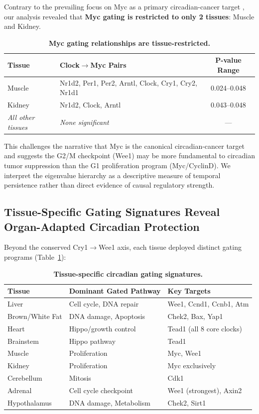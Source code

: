 \documentclass[11pt,letterpaper]{article}
\begin{document}
Contrary to the prevailing focus on Myc as a primary circadian-cancer target \citep{altman2015}, our analysis revealed that \textbf{Myc gating is restricted to only 2 tissues}: Muscle and Kidney.

\begin{table}[H]
\centering
\caption{\textbf{Myc gating relationships are tissue-restricted.}}
\begin{tabular}{llc}
\toprule
\textbf{Tissue} & \textbf{Clock$\rightarrow$Myc Pairs} & \textbf{P-value Range} \\
\midrule
Muscle & Nr1d2, Per1, Per2, Arntl, Clock, Cry1, Cry2, Nr1d1 & 0.024--0.048 \\
Kidney & Nr1d2, Clock, Arntl & 0.043--0.048 \\
\textit{All other tissues} & \textit{None significant} & --- \\
\bottomrule
\end{tabular}
\end{table}

This challenges the narrative that Myc is the canonical circadian-cancer target and suggests the G2/M checkpoint (Wee1) may be more fundamental to circadian tumor suppression than the G1 proliferation program (Myc/CyclinD). We interpret the eigenvalue hierarchy as a descriptive measure of temporal persistence rather than direct evidence of causal regulatory strength.

\subsection{Tissue-Specific Gating Signatures Reveal Organ-Adapted Circadian Protection}

Beyond the conserved Cry1$\rightarrow$Wee1 axis, each tissue deployed distinct gating programs (Table~\ref{tab:signatures}):

\begin{table}[H]
\centering
\caption{\textbf{Tissue-specific circadian gating signatures.}}
\label{tab:signatures}
\begin{tabular}{lll}
\toprule
\textbf{Tissue} & \textbf{Dominant Gated Pathway} & \textbf{Key Targets} \\
\midrule
Liver & Cell cycle, DNA repair & Wee1, Ccnd1, Ccnb1, Atm \\
Brown/White Fat & DNA damage, Apoptosis & Chek2, Bax, Yap1 \\
Heart & Hippo/growth control & Tead1 (all 8 core clocks) \\
Brainstem & Hippo pathway & Tead1 \\
Muscle & Proliferation & Myc, Wee1 \\
Kidney & Proliferation & Myc exclusively \\
Cerebellum & Mitosis & Cdk1 \\
Adrenal & Cell cycle checkpoint & Wee1 (strongest), Axin2 \\
Hypothalamus & DNA damage, Metabolism & Chek2, Sirt1 \\
\bottomrule
\end{tabular}
\end{table}
\end{document}
